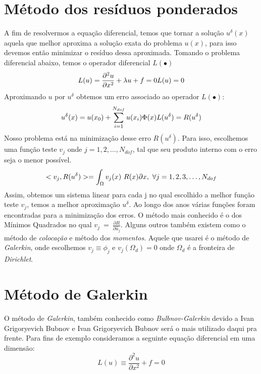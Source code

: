 \section{Método dos resíduos ponderados}
 A fim de resolvermos a equação diferencial, temos que tornar a solução $u^\delta(x)$ aquela que melhor aproxima a solução exata do problema $u(x)$, para isso devemos então minimizar o resíduo dessa aproximada. Tomando o problema diferencial abaixo, temos o operador diferencial $L(\bullet)$
 \begin{equation}
    L(u) = \frac{\partial^2 u}{\partial x^2} + \lambda u + f = 0 \\
    L(u) = 0
 \end{equation}
 Aproximando $u$ por $u^\delta$ obtemos um erro associado ao operador $L(\bullet)$:
 \begin{equation}
 	u^\delta(x) = u(x_0) + \sum^{N_{dof}}_{i = 1} u(x_i) \Phi(x)\\
    L(u^\delta) = R(u^\delta)
\end{equation}
Nosso problema está na minimização desse erro $R(u^\delta)$. Para isso, escolhemos uma função teste $v_j$ onde $j = 1,2,\dots, N_{dof}$, tal que seu produto interno com o erro seja o menor possível.
\begin{equation}
    <v_j,R(u^\delta)> = \int_{\Omega} v_j(x)\ R(x) \partial x,\ \forall j = 1,2,3,\dots,N_{dof}\\
\end{equation}
Assim, obtemos um sistema linear para cada j no qual escolhido a melhor função teste $v_j$, temos a melhor aproximação $u^\delta$. Ao longo dos anos várias funções foram encontradas para a minimização dos erros. O método mais conhecido é o dos Mínimos Quadrados no qual $v_j\ =\ \frac{\partial R}{\partial \hat{u}_j}$. Alguns outros também existem como o método de \emph{colocação} e método dos \emph{momentos}. Aquele que usarei é o método de \emph{Galerkin}, onde escolhemos $v_j \equiv \phi_j$ e $v_j(\Omega_d) = 0$ onde $\Omega_d$ é a fronteira de \emph{Dirichlet}.

\section{Método de Galerkin}
 O método de \emph{Galerkin}, também conhecido como \emph{Bulbnov-Galerkin} devido a Ivan Grigoryevich Bubnov  e Ivan Grigoryevich Bubnov  será o mais utilizado daqui pra frente. Para fins de exemplo consideramos a seguinte equação diferencial em uma dimensão:
 \begin{equation}\label{eq:eq_dif}
 L(u) \equiv \frac{\partial^2 u}{\partial x^2} + f = 0
 \end{equation}
 
